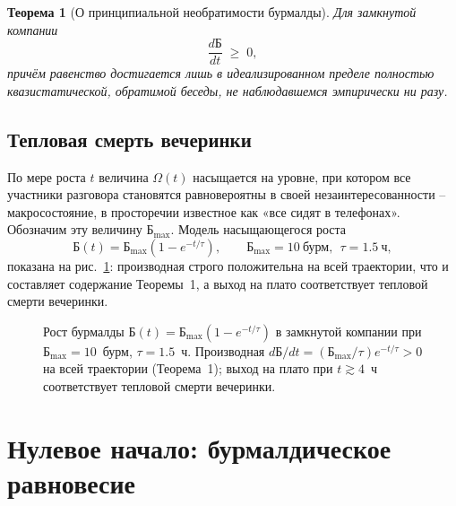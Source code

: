 \documentclass[11pt,a4paper]{article}
\newtheorem{theorem}{Теорема}
\newcommand{\Burm}{\text{Б}}
\begin{document}
\begin{theorem}[О принципиальной необратимости бурмалды]
Для замкнутой компании
\[
\frac{d\Burm}{dt} \;\geq\; 0,
\]
причём равенство достигается лишь в идеализированном пределе полностью квазистатической, обратимой беседы, не наблюдавшемся эмпирически ни разу.
\end{theorem}

\subsection{Тепловая смерть вечеринки}

По мере роста $t$ величина $\Omega(t)$ насыщается на уровне, при котором все участники разговора становятся равновероятны в своей незаинтересованности -- макросостояние, в просторечии известное как «все сидят в телефонах». Обозначим эту величину $\Burm_{\max}$. Модель насыщающегося роста
\[
\Burm(t) = \Burm_{\max}\left(1-e^{-t/\tau}\right),\qquad \Burm_{\max}=10\ \text{бурм},\ \ \tau=1.5\ \text{ч},
\]
показана на рис.~\ref{fig:burm-time}: производная строго положительна на всей траектории, что и составляет содержание Теоремы~1, а выход на плато соответствует тепловой смерти вечеринки.

\begin{figure}[htbp]
\centering
{}
\caption{Рост бурмалды $\Burm(t)=\Burm_{\max}(1-e^{-t/\tau})$ в замкнутой компании при $\Burm_{\max}=10$~бурм, $\tau=1.5$~ч. Производная $d\Burm/dt=(\Burm_{\max}/\tau)e^{-t/\tau}>0$ на всей траектории (Теорема~1); выход на плато при $t\gtrsim4$~ч соответствует тепловой смерти вечеринки.}
\label{fig:burm-time}
\end{figure}

\section{Нулевое начало: бурмалдическое равновесие}
\end{document}
